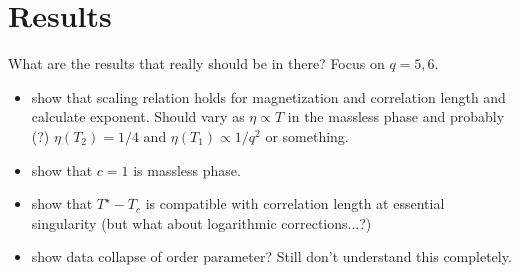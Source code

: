\section{Results}

What are the results that really should be in there? Focus on $q = 5, 6$.

\begin{itemize}
  \item show that scaling relation holds for magnetization and correlation length and calculate exponent. Should vary as
  $\eta \propto T$ in the massless phase and probably (?) $\eta(T_2) = 1/4$ and $\eta(T_1) \propto 1/q^2$ or something.
  \item show that $c = 1$ is massless phase.
  \item show that $T^{\star} - T_c$ is compatible with correlation length at essential singularity (but what about
  logarithmic corrections...?)
  \item show data collapse of order parameter? Still don't understand this completely.
\end{itemize}
